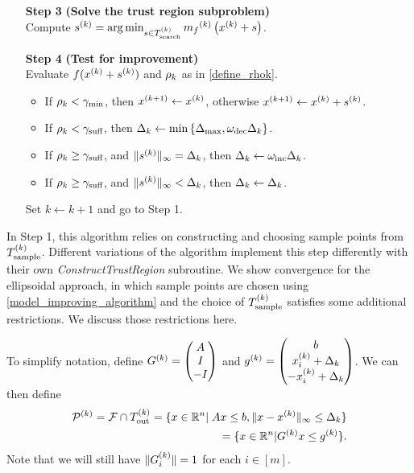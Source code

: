 \begin{algorithm}[H]
\begin{itemize}
        \item[\textbf{Step 3}] \textbf{(Solve the trust region subproblem)} \\
            Compute ${{s}^{(k)}} = \operatorname*{arg\,min}_{s \in {T_{\text{search}}^{(k)}}} {{m}_f}^{(k)}\left(x^{(k)} + s\right)$. 
            
        \item[\textbf{Step 4}] \textbf{(Test for improvement)} \\
            Evaluate $f(x^{(k)} + {{s}^{(k)}})$ and $\rho_k$ as in \cref{define_rhok}.
            \begin{itemize}
            	\item If $\rho_k < \gamma_{\textrm{min}}$, then ${{x}^{(k+1)}} \gets x^{(k)}$, otherwise ${{x}^{(k+1)}} \gets x^{(k)} + {{s}^{(k)}}$.
            	\item If $\rho_k < \gamma_{\textrm{suff}}$, then $\Delta_k \gets \min\left\{{\Delta_{\textrm{max}}}, \omega_{\text{dec}}\Delta_k\right\}$.
            	\item If $\rho_k \ge \gamma_{\textrm{suff}}$, and $\|{{s}^{(k)}}\|_{\infty} = \Delta_k$, then $\Delta_k \gets \omega_{\text{inc}}\Delta_k$.
            	\item If $\rho_k \ge \gamma_{\textrm{suff}}$, and $\|{{s}^{(k)}}\|_{\infty} < \Delta_k$, then $\Delta_k \gets \Delta_k$.
            \end{itemize}
            Set $k \gets k+1$ and go to Step 1.
    \end{itemize}
\end{algorithm}

In Step 1, this algorithm relies on constructing and choosing sample points from ${T_{\text{sample}}^{(k)}}$.
Different variations of the algorithm implement this step differently with their own \emph{ConstructTrustRegion} subroutine.
We show convergence for the ellipsoidal approach, in which sample points are chosen using \cref{model_improving_algorithm}
and the choice of ${T_{\text{sample}}^{(k)}}$ satisfies some additional restrictions.
We discuss those restrictions here.

To simplify notation, define $G^{(k)} = \begin{pmatrix} {A} \\ I \\ -I \end{pmatrix}$ and 
${g^{(k)}} = \begin{pmatrix} {b} \\ x_i^{(k)}+\Delta_k \\ -x_i^{(k)}+\Delta_k \end{pmatrix}$.
We can then define
\begin{align}
{{\mathcal{P}}^{(k)}} = {\mathcal F} \cap {T_{\text{out}}^{(k)}} =  \{x \in \mathbb R^n | \; {A} x \le {b}, \|x - x^{(k)}\|_{\infty} \le \Delta_k \} \label{polyhedron_k}  \\
= \{x \in \mathbb R^n | G^{(k)} x \le {g^{(k)}} \}. \nonumber
\end{align}
Note that we will still have $\|G^{(k)}_i\| = 1$ for each $i \in [m]$.

